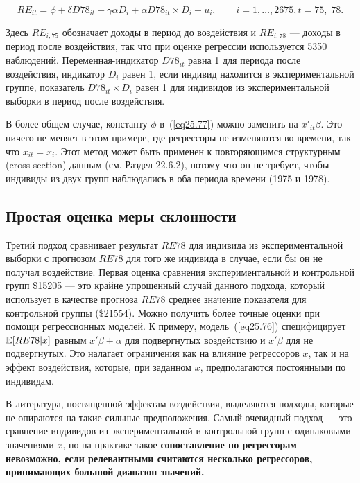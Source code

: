 \begin{equation}
\label{eq25.77}
RE_{it} = \phi + \delta D78_{it} + \gamma \alpha D_i + \alpha D78_{it} \times D_i + u_{i}, \qquad i = 1, \dots, 2675, t = 75, \; 78.
\end{equation}

Здесь $RE_{i, 75}$ обозначает доходы в период до воздействия и $RE_{i,78}$ --- доходы в период после воздействия, так что при оценке регрессии используется 5350 наблюдений. Переменная-индикатор $D78_{it}$ равна 1 для периода после воздействия, индикатор $D_i$ равен 1, если индивид находится в экспериментальной группе, показатель $ D78_{it} \times D_i $ равен 1 для индивидов из экспериментальной выборки в период после воздействия. 

В более общем случае, константу $\phi$ в~(\ref{eq25.77}) можно заменить на $x'_{it} \beta$. Это ничего не меняет в этом примере, где регрессоры не изменяются во времени, так что $x_{it} = x_i$. Этот метод может быть применен к повторяющимся структурным (cross-section) данным (см. Раздел 22.6.2), потому что он не требует, чтобы индивиды из двух групп наблюдались в оба периода времени (1975 и 1978). 

\subsection{Простая оценка меры склонности}

Третий подход сравнивает результат $RE78$ для индивида из экспериментальной выборки с прогнозом $RE78$ для того же индивида в случае, если бы он не получал воздействие. Первая оценка сравнения экспериментальной и контрольной групп \$15205 --- это крайне упрощенный случай данного подхода, который использует в качестве прогноза $RE78$ среднее значение показателя для контрольной группы (\$21554). Можно получить более точные оценки при помощи регрессионных моделей. К примеру, модель~(\ref{eq25.76}) специфицирует $\mathbb{E}[RE78|x]$ равным $x'\beta + \alpha$ для подвергнутых воздействию и $x' \beta$ для не подвергнутых. Это налагает ограничения как на влияние регрессоров $x$, так и на эффект воздействия, которые, при заданном $x$, предполагаются постоянными по индивидам. 

В литература, посвященной эффектам воздействия, выделяются подходы, которые не опираются на такие сильные предположения. Самый очевидный подход --- это сравнение индивидов из экспериментальной и контрольной групп с одинаковыми значениями $x$, но на практике такое \bfseries сопоставление по регрессорам \mdseries невозможно, если релевантными считаются несколько регрессоров, принимающих большой диапазон значений. 


